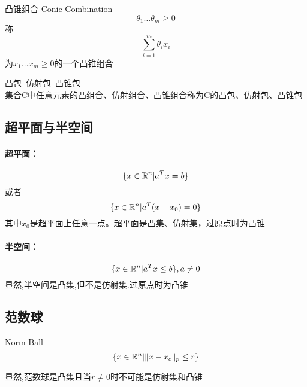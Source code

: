 \documentclass{mytemplate}
\begin{document}
\begin{definition}{凸锥组合 Conic Combination}
    \[\theta_1 \dots \theta_m \geq 0\]
    称
    \[
        \sum_{i=1}^{m} \theta_i x_i
    \]
    为$x_1 \dots x_m \geq 0$的一个凸锥组合
\end{definition}

\begin{definition}{凸包\ 仿射包\ 凸锥包}\\
    集合C中任意元素的凸组合、仿射组合、凸锥组合称为C的凸包、仿射包、凸锥包
\end{definition}

\newpage
\subsection{超平面与半空间}
\paragraph*{超平面：}
\[
    \{x \in \mathbb{R}^n | a^T x=b\}
\]
或者
\[
    \{x \in \mathbb{R}^n | a^T (x-x_0) =0\}
\]
其中$x_0$是超平面上任意一点。超平面是凸集、仿射集，过原点时为凸锥

\paragraph*{半空间：}
\[
    \{x \in \mathbb{R}^n | a^T x \leq b\} , a \neq 0
\]
显然,半空间是凸集,但不是仿射集.过原点时为凸锥


\newpage
\subsection{范数球}

\begin{definition}{Norm Ball}
    \[\{x \in \mathbb{R}^n | \|x - x_c\|_p \leq r\}
    \]
\end{definition}
显然,范数球是凸集且当$r\neq0$时不可能是仿射集和凸锥
\end{document}
